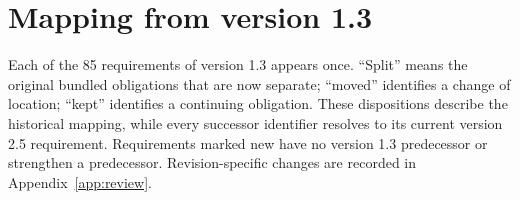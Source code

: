 \section{Mapping from version 1.3}\label{app:mapping}
Each of the 85 requirements of version 1.3 appears once. ``Split'' means the original bundled obligations that are now separate; ``moved'' identifies a change of location; ``kept'' identifies a continuing obligation. These dispositions describe the historical mapping, while every successor identifier resolves to its current version 2.5 requirement. Requirements marked new have no version 1.3 predecessor or strengthen a predecessor. Revision-specific changes are recorded in Appendix~\ref{app:review}.

